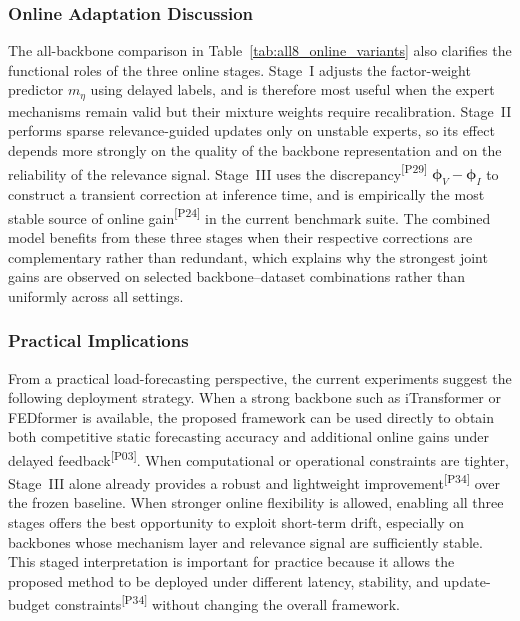 ﻿\documentclass[journal]{IEEEtran}
\DeclareRobustCommand{\auditbad}[2]{{\color{auditred}#1}{\color{auditred}\textsuperscript{[#2]}}}
\begin{document}
\subsubsection{Online Adaptation Discussion}
The all-backbone comparison in Table~\ref{tab:all8_online_variants} also clarifies the functional roles of the three online stages. Stage~I adjusts the factor-weight predictor $m_{\eta}$ using delayed labels, and is therefore most useful when the expert mechanisms remain valid but their mixture weights require recalibration. Stage~II performs sparse relevance-guided updates only on unstable experts, so its effect depends more strongly on the quality of the backbone representation and on the reliability of the relevance signal. \auditbad{Stage~III uses the discrepancy}{P29} $\boldsymbol{\phi}_V-\boldsymbol{\phi}_I$ to construct a transient correction at inference time, and is \auditbad{empirically the most stable source of online gain}{P24} in the current benchmark suite. The combined model benefits from these three stages when their respective corrections are complementary rather than redundant, which explains why the strongest joint gains are observed on selected backbone--dataset combinations rather than uniformly across all settings.

\subsubsection{Practical Implications}
From a practical load-forecasting perspective, the current experiments suggest the following deployment strategy. When a strong backbone such as iTransformer or FEDformer is available, the proposed framework can be used directly to obtain both competitive static forecasting accuracy and additional online gains under \auditbad{delayed feedback}{P03}. When computational or operational constraints are tighter, Stage~III alone already provides a \auditbad{robust and lightweight improvement}{P34} over the frozen baseline. When stronger online flexibility is allowed, enabling all three stages offers the best opportunity to exploit short-term drift, especially on backbones whose mechanism layer and relevance signal are sufficiently stable. This staged interpretation is important for practice because it allows the proposed method to be deployed under different \auditbad{latency, stability, and update-budget constraints}{P34} without changing the overall framework.

\FloatBarrier
\balance
\end{document}
